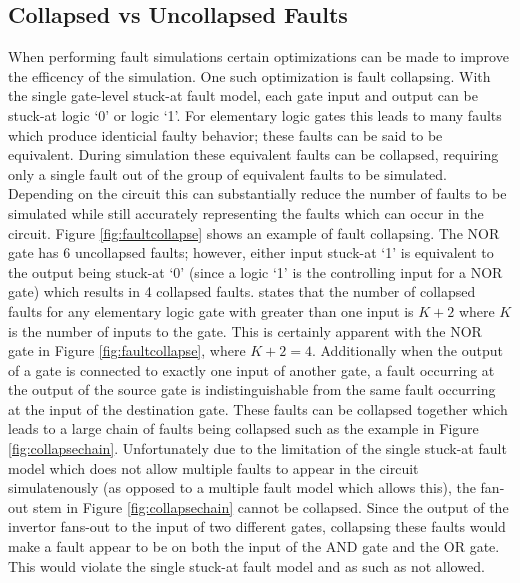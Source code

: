 \documentclass[12pt]{report}
\begin{document}
\subsection{Collapsed vs Uncollapsed Faults}
When performing fault simulations certain optimizations can be made to improve the efficency of the simulation.  One such optimization is fault collapsing.  With the single gate-level stuck-at fault model, each gate input and output can be stuck-at logic `0' or logic `1'.  For elementary logic gates this leads to many faults which produce identicial faulty behavior; these faults can be said to be equivalent\cite{stroud}.  During simulation these equivalent faults can be collapsed, requiring only a single fault out of the group of equivalent faults to be simulated\cite{stroud}.  Depending on the circuit this can substantially reduce the number of faults to be simulated while still accurately representing the faults which can occur in the circuit\cite{stroud}.  Figure \ref{fig:faultcollapse} shows an example of fault collapsing.  The NOR gate has 6 uncollapsed faults; however, either input stuck-at `1' is equivalent to the output being stuck-at `0' (since a logic `1' is the controlling input for a NOR gate) which results in 4 collapsed faults.  \cite{stroud} states that the number of collapsed faults for any elementary logic gate with greater than one input is $K+2$ where $K$ is the number of inputs to the gate.  This is certainly apparent with the NOR gate in Figure \ref{fig:faultcollapse}, where $K+2=4$.  Additionally when the output of a gate is connected to exactly one input of another gate, a fault occurring at the output of the source gate is indistinguishable from the same fault occurring at the input of the destination gate\cite{stroud}.  These faults can be collapsed together which leads to a large chain of faults being collapsed such as the example in Figure \ref{fig:collapsechain}\cite{stroud}.  Unfortunately due to the limitation of the single stuck-at fault model which does not allow multiple faults to appear in the circuit simulatenously (as opposed to a multiple fault model which allows this), the fan-out stem in Figure \ref{fig:collapsechain} cannot be collapsed.  Since the output of the invertor fans-out to the input of two different gates, collapsing these faults would make a fault appear to be on both the input of the AND gate and the OR gate.  This would violate the single stuck-at fault model and as such as not allowed\cite{stroud}.
\end{document}
